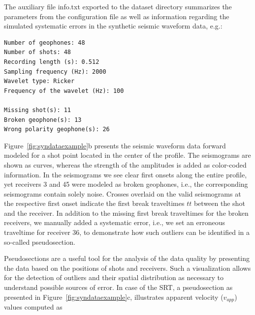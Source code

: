 \documentclass[a4paper,fleqn]{cas-sc}
\begin{document}
The auxiliary file info.txt exported to the dataset directory summarizes the parameters from the configuration file as well as information regarding the simulated systematic errors in the synthetic seismic waveform data, e.g.:
\begin{footnotesize}
\begin{verbatim}
Number of geophones: 48
Number of shots: 48
Recording length (s): 0.512
Sampling frequency (Hz): 2000
Wavelet type: Ricker
Frequency of the wavelet (Hz): 100

Missing shot(s): 11
Broken geophone(s): 13
Wrong polarity geophone(s): 26
\end{verbatim}
\end{footnotesize}

Figure~\ref{fig:syndataexample}b presents the seismic waveform data forward modeled for a shot point located in the center of the profile. The seismograms are shown as curves, whereas the strength of the amplitudes is added as color-coded information. In the seismograms we see clear first onsets along the entire profile, yet receivers 3 and 45 were modeled as broken geophones, i.e., the corresponding seismograms contain solely noise. Crosses overlaid on the valid seismograms at the respective first onset indicate the first break traveltimes $tt$ between the shot and the receiver. In addition to the missing first break traveltimes for the broken receivers, we manually added a systematic error, i.e., we set an erroneous traveltime for receiver 36, to demonstrate how such outliers can be identified in a so-called pseudosection.

Pseudosections are a useful tool for the analysis of the data quality by presenting the data based on the positions of shots and receivers. Such a visualization allows for the detection of outliers and their spatial distribution as necessary to understand possible sources of error. In case of the SRT, a pseudosection as presented in Figure~\ref{fig:syndataexample}c, illustrates apparent velocity ($v_{app}$) values computed as
\end{document}
